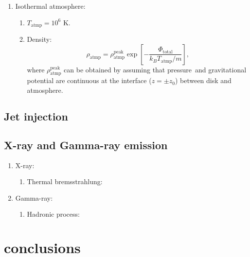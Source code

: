\documentclass[twocolumn]{aastex631}
\begin{document}
\begin{enumerate}
\begin{enumerate}
    \item The fractal density is created using the publicly\
          available pyFC code\footnote{\url{https://pypi.python.org/pypi/pyFC}}.
  \end{enumerate}


\item Isothermal atmosphere:
  \begin{enumerate}
     \item $T_{\text{atmp}}=10^{6}$ K. \citep{temperature-MW}
     \item Density:
          \begin{equation}
             \rho_{\text{atmp}}=\rho_{\text{atmp}}^{\text{peak}}
             \exp\left[-\frac{\Phi_{\text{total}}}{k_{B}T_{\text{atmp}}/m}\right],
             \label{atmosphere-density}
          \end{equation}
          where $\rho_{\text{atmp}}^{\text{peak}}$ can be obtained by assuming that pressure\
          and gravitational potential are continuous at the interface ($z=\pm z_{0}$) between disk and atmosphere.
  \end{enumerate}



\end{enumerate}
\subsection{Jet injection}

\subsection{X-ray and Gamma-ray emission}
  \begin{enumerate}
    \item X-ray:
       \begin{enumerate}
         \item Thermal bremsstrahlung:
       \end{enumerate}
    \item Gamma-ray:
       \begin{enumerate}
         \item Hadronic process:
       \end{enumerate}
  \end{enumerate}


\section{conclusions}
\end{document}
